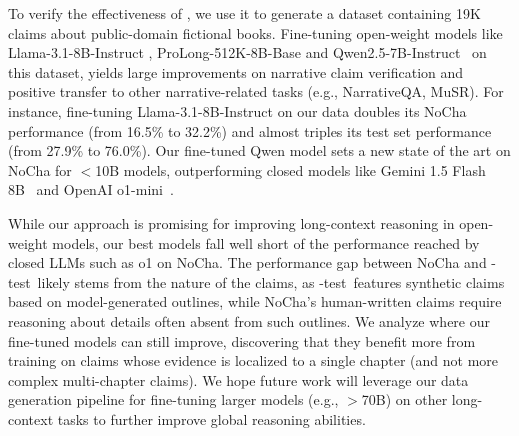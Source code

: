 To verify the effectiveness of \pipeline, we use it to generate a dataset containing 19K claims about public-domain fictional books. Fine-tuning open-weight models like Llama-3.1-8B-Instruct \cite{dubey2024llama}, ProLong-512K-8B-Base \cite{gao_how_2024} and Qwen2.5-7B-Instruct~\cite{qwen_qwen25_2024} on this dataset, yields large improvements on narrative claim verification and positive transfer to other narrative-related tasks (e.g., NarrativeQA, MuSR). For instance, fine-tuning Llama-3.1-8B-Instruct on our data doubles its NoCha performance (from 16.5\% to 32.2\%) and almost triples its test set performance (from 27.9\% to 76.0\%). Our fine-tuned Qwen model sets a new state of the art on NoCha for $<$10B models, outperforming closed models like Gemini 1.5 Flash 8B~\cite{geminiteam2024gemini15unlockingmultimodal} and OpenAI o1-mini~\cite{openai_o1_2024}.

\vspace{-0.1pt}
While our approach is promising for improving long-context reasoning in open-weight models, our best models fall well short of the performance reached by closed LLMs such as o1 on NoCha. The performance gap between NoCha and \pipeline-test\ likely stems from the nature of the claims, as \pipeline-test\ features synthetic claims based on model-generated outlines, while NoCha’s human-written claims require reasoning about details often absent from such outlines. We analyze where our fine-tuned models can still improve, discovering that they benefit more from training on claims whose evidence is localized to a single chapter (and not more complex multi-chapter claims). We hope future work will leverage our data generation pipeline for fine-tuning larger models (e.g., $>$70B) on other long-context tasks to further improve global reasoning abilities.




